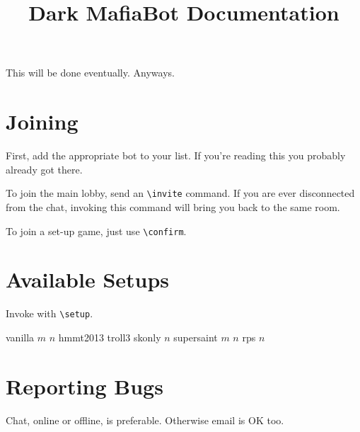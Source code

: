 \documentclass[11pt]{scrartcl}
\begin{document}
\title{Dark MafiaBot Documentation}
\maketitle

This will be done eventually.  Anyways.

\section{Joining}
First, add the appropriate bot to your list.  If you're reading this you probably already got there.

To join the main lobby, send an \verb+\invite+ command.  If you are ever disconnected from the chat, invoking this command will bring you back to the same room.

To join a set-up game, just use \verb+\confirm+.

\section{Available Setups}
Invoke with \verb+\setup+.

\begin{itemize}
	\ii vanilla $m$ $n$
	\ii hmmt2013
	\ii troll3
	\ii skonly $n$
	\ii supersaint $m$ $n$
	\ii rps $n$
\end{itemize}

\section{Reporting Bugs}
Chat, online or offline, is preferable.  Otherwise email is OK too.
\end{document}
